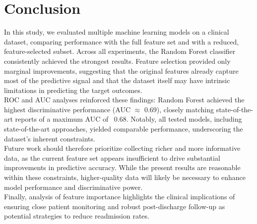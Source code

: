 \section{Conclusion}

In this study, we evaluated multiple machine learning models on a clinical dataset, comparing performance with the full feature set and with a reduced, feature-selected subset. Across all experiments, the Random Forest classifier consistently achieved the strongest results. Feature selection provided only marginal improvements, suggesting that the original features already capture most of the predictive signal and that the dataset itself may have intrinsic limitations in predicting the target outcomes.\\
ROC and AUC analyses reinforced these findings: Random Forest achieved the highest discriminative performance (AUC $\approx$ 0.69), closely matching state-of-the-art reports of a maximum AUC of ~0.68. Notably, all tested models, including state-of-the-art approaches, yielded comparable performance, underscoring the dataset’s inherent constraints.\\
Future work should therefore prioritize collecting richer and more informative data, as the current feature set appears insufficient to drive substantial improvements in predictive accuracy. While the present results are reasonable within these constraints, higher-quality data will likely be necessary to enhance model performance and discriminative power.\\
Finally, analysis of feature importance highlights the clinical implications of ensuring close patient monitoring and robust post-discharge follow-up as potential strategies to reduce readmission rates.
